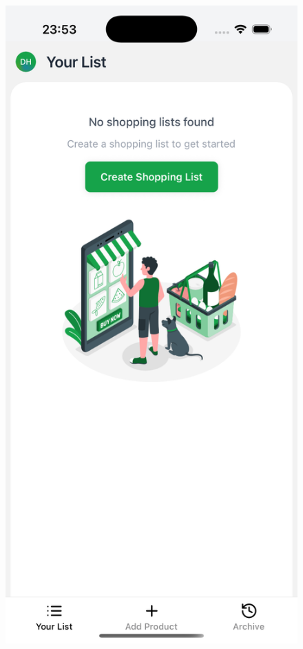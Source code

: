 \begin{figure}[h!]
    \centering
    \begin{minipage}[b]{0.23\textwidth}
        \includegraphics[width=\textwidth]{media/empty-list.png}

\end{minipage}
\end{figure}
